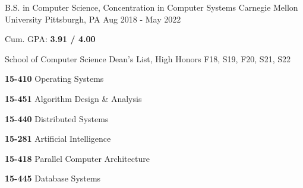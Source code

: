 
\begin{cventries}

  \cventry
    {B.S. in Computer Science, Concentration in Computer Systems} %
    {Carnegie Mellon University} %
    {Pittsburgh, PA} %
    {Aug 2018 - May 2022} %
    {
      \begin{cvitems} %
      \item {Cum. GPA: \textbf{3.91 / 4.00}}
        \item {School of Computer Science Dean's List, High Honors F18, S19, F20, S21, S22}
        \item {}
            \vspace{0.5mm}
            \setlength\multicolsep{0pt}
            \begin{multicols}{3}
              \item[] {\textbf{15-410} Operating Systems}
              \item[] {\textbf{15-451} Algorithm Design \& Analysis}
              \item[] {\textbf{15-440} Distributed Systems}
              \item[] {\textbf{15-281} Artificial Intelligence}
              \item[] {\textbf{15-418} Parallel Computer Architecture}
              \item[] {\textbf{15-445} Database Systems}
            \end{multicols}
      \end{cvitems}
    }

\end{cventries}
